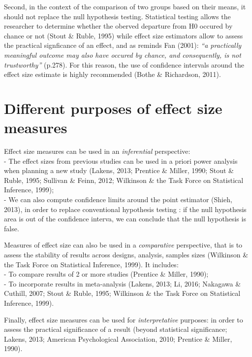 \documentclass[
  man]{apa6}
\begin{document}
Second, in the context of the comparison of two groups based on their means, it should not replace the null hypothesis testing. Statistical testing allows the researcher to determine whether the oberved departure from H0 occured by chance or not (Stout \& Ruble, 1995) while effect size estimators allow to assess the practical signficance of an effect, and as reminds Fan (2001): \emph{\enquote{a practically meaningful outcome may also have occured by chance, and consequently, is not trustworthy}} (p.278). For this reason, the use of confidence intervals around the effect size estimate is highly recommended (Bothe \& Richardson, 2011).

\hypertarget{different-purposes-of-effect-size-measures}{%
\section{Different purposes of effect size measures}\label{different-purposes-of-effect-size-measures}}

Effect size measures can be used in an \emph{inferential} perspective:\\
- The effect sizes from previous studies can be used in a priori power analysis when planning a new study (Lakens, 2013; Prentice \& Miller, 1990; Stout \& Ruble, 1995; Sullivan \& Feinn, 2012; Wilkinson \& the Task Force on Statistical Inference, 1999);\\
- We can also compute confidence limits around the point estimator (Shieh, 2013), in order to replace conventional hypothesis testing : if the null hypothesis area is out of the confidence interva, we can conclude that the null hypothesis is false.

Measures of effect size can also be used in a \emph{comparative} perspective, that is to assess the stability of results across designs, analysis, samples sizes (Wilkinson \& the Task Force on Statistical Inference, 1999). It includes:\\
- To compare results of 2 or more studies (Prentice \& Miller, 1990);\\
- To incorporate results in meta-analysis (Lakens, 2013; Li, 2016; Nakagawa \& Cuthill, 2007; Stout \& Ruble, 1995; Wilkinson \& the Task Force on Statistical Inference, 1999).

Finally, effect size measures can be used for \emph{interpretative} purposes: in order to assess the practical significance of a result (beyond statistical significance; Lakens, 2013; American Psychological Association, 2010; Prentice \& Miller, 1990).
\end{document}
